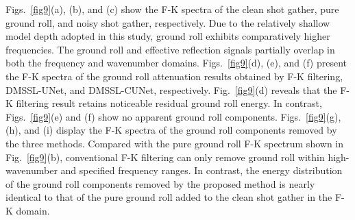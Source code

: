 \documentclass[a4paper,fleqn]{cas-dc}
\begin{document}
Figs.~\ref{fig9}(a), (b), and (c) show the F-K spectra of the clean shot gather, 
pure ground roll, and noisy shot gather, respectively. Due to the relatively shallow model 
depth adopted in this study, ground roll exhibits comparatively higher frequencies. The 
ground roll and effective reflection signals partially overlap in both the frequency and 
wavenumber domains. Figs.~\ref{fig9}(d), (e), and (f) present the F-K spectra 
of the ground roll attenuation results obtained by F-K filtering, DMSSL-UNet, and 
DMSSL-CUNet, respectively. Fig.~\ref{fig9}(d) reveals that the F-K filtering 
result retains noticeable residual ground roll energy. In contrast, Figs.~\ref{fig9}(e) 
and (f) show no apparent ground roll components. Figs.~\ref{fig9}(g), (h), and 
(i) display the F-K spectra of the ground roll components removed by the three methods. 
Compared with the pure ground roll F-K spectrum shown in Fig.~\ref{fig9}(b), 
conventional F-K filtering can only remove ground roll within high-wavenumber and specified 
frequency ranges. In contrast, the energy distribution of the ground roll components removed 
by the proposed method is nearly identical to that of the pure ground roll added to the clean 
shot gather in the F-K domain.
\end{document}
